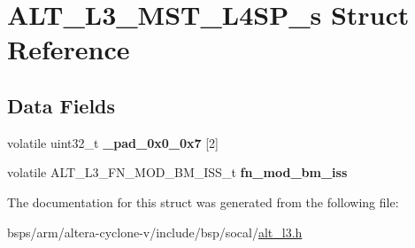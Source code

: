 \hypertarget{structALT__L3__MST__L4SP__s}{}\section{A\+L\+T\+\_\+\+L3\+\_\+\+M\+S\+T\+\_\+\+L4\+S\+P\+\_\+s Struct Reference}
\label{structALT__L3__MST__L4SP__s}
\subsection*{Data Fields}
\begin{DoxyCompactItemize}
\item 
\mbox{\label{structALT__L3__MST__L4SP__s_a72b0d3bcfea8d4daf2be83dbd5a728b6}} 
volatile uint32\+\_\+t {\bfseries \+\_\+pad\+\_\+0x0\+\_\+0x7} \mbox{[}2\mbox{]}
\item 
\mbox{\label{structALT__L3__MST__L4SP__s_add9711056433a0907b05df5f5fb9ff15}} 
volatile A\+L\+T\+\_\+\+L3\+\_\+\+F\+N\+\_\+\+M\+O\+D\+\_\+\+B\+M\+\_\+\+I\+S\+S\+\_\+t {\bfseries fn\+\_\+mod\+\_\+bm\+\_\+iss}
\end{DoxyCompactItemize}


The documentation for this struct was generated from the following file\+:\begin{DoxyCompactItemize}
\item 
bsps/arm/altera-\/cyclone-\/v/include/bsp/socal/\mbox{\hyperlink{alt__l3_8h}{alt\+\_\+l3.\+h}}\end{DoxyCompactItemize}
